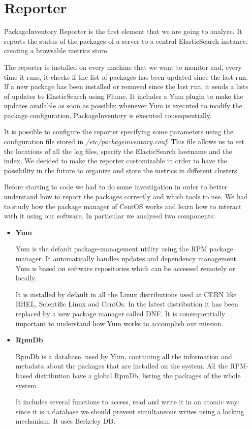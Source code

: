 \section{Reporter}

PackageInventory Reporter is the first element that we are going to
analyze. It reports the status of the packages of a server to a central
ElasticSearch instance, creating a browsable metrics store.

The reporter is installed on every machine that we want to monitor and,
every time it runs, it checks if the list of packages has been updated
since the last run. If a new package has been installed or removed since
the last run, it sends a lists of updates to ElasticSearch using Flume. It
includes a Yum plugin to make the updates available as soon as possible:
whenever Yum is executed to modify the package configuration,
PackageInventory is executed consequentially.

It is possible to configure the reporter specifying some parameters using
the configuration file stored in \textit{/etc/packageinventory.conf}. This
file allows us to set the locations of all the log files, specify the
ElasticSearch hostname and the index. We decided to make the reporter
customizable in order to have the possibility in the future to organize
and store the metrics in different clusters.

Before starting to code we had to do some investigation in order to better
understand how to report the packages correctly and which tools to use. We
had to study how the package manager of CentOS works and learn how to
interact with it using our software. In particular we analysed two
components: 

\begin{itemize}
  \item \textbf{Yum}

  Yum \cite{YumWebsite} is the default package-management utility using
  the RPM package manager. It automatically handles updates and dependency
  management. Yum is based on software repositories which can be accessed
  remotely or locally.
  
  It is installed by default in all the Linux distributions used at CERN
  like RHEL, Scientific Linux and CentOs. In the latest distribution it
  has been replaced by a new package manager called DNF. It is
  consequentially important to understand how Yum works to accomplish our
  mission.

  \item \textbf{RpmDb}

  RpmDb \cite{RpmDbWebsite} is a database, used by Yum, containing all the
  information and metadata about the packages that are installed on the
  system. All the RPM-based distribution have a global RpmDb, listing the
  packages of the whole system.
  
  It includes several functions to access, read and write it in an atomic
  way: since it is a database we should prevent simultaneous writes using
  a locking mechanism. It uses Berkeley DB.

\end{itemize}

